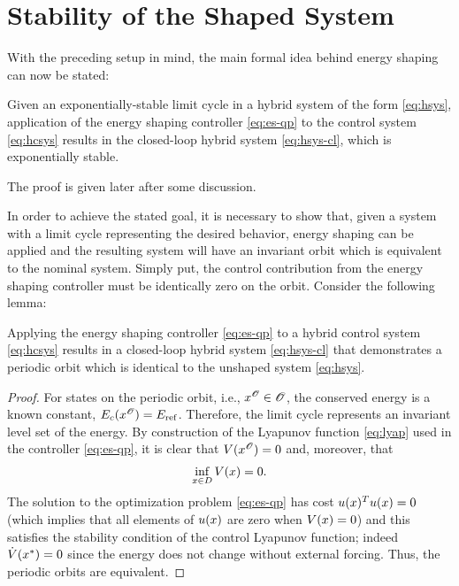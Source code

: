   


\section{Stability of the Shaped System} \label{sec:stab}

With the preceding setup in mind, the main formal idea behind energy shaping can
now be stated:
%
\begin{theorem}
  \label{theorem:main-theorem}
  Given an exponentially-stable limit cycle in a hybrid system of the form
  \eqref{eq:hsys}, application of the energy shaping controller \eqref{eq:es-qp}
  to the control system \eqref{eq:hcsys} results in the closed-loop hybrid
  system \eqref{eq:hsys-cl}, which is exponentially stable.
\end{theorem}
%

The proof is given later after some discussion.


In order to achieve the stated goal, it is necessary to show that, given a
system with a limit cycle representing the desired behavior, energy shaping can
be applied and the resulting system will have an invariant orbit which is
equivalent to the nominal system. Simply put, the control contribution from the
energy shaping controller must be identically zero on the orbit. Consider the
following lemma:

\begin{lemma}
  Applying the energy shaping controller \eqref{eq:es-qp} to a hybrid control
  system \eqref{eq:hcsys} results in a closed-loop hybrid system
  \eqref{eq:hsys-cl} that demonstrates a periodic orbit which is identical to
  the unshaped system \eqref{eq:hsys}.
\end{lemma}

\begin{proof}
  For states on the periodic orbit, i.e., $x^{\mathscr{O}} \in \mathscr{O}$, the conserved energy
  is a known constant, $E_{c}(x^{\mathscr{O}}) = E_{\mathrm{ref}}$.
  Therefore, the limit cycle represents an invariant level set of the energy.
  By construction of the Lyapunov function \eqref{eq:lyap} used in the
  controller \eqref{eq:es-qp}, it is clear that $V(x^{\mathscr{O}}) = 0$ and, moreover, that
  \begin{align*}
    \inf_{x \in D} V(x) = 0.
  \end{align*}
  The solution to the optimization problem \eqref{eq:es-qp} has cost $u(x)^T
  u(x) = 0$ (which implies that all elements of $u(x)$ are zero when $V(x) =
  0$) and this satisfies the stability condition of the control Lyapunov
  function;
  indeed ${\dot V}(x^{*}) = 0$ since the energy does not change without external
  forcing.
  Thus, the periodic orbits are equivalent.
\end{proof}

